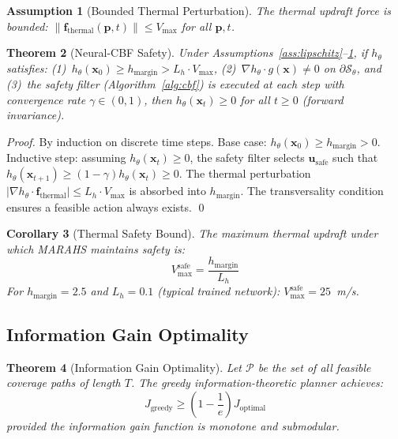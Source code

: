 \documentclass[12pt,a4paper]{article}
\DeclareRobustCommand{\cP}{\mathcal{P}}
\DeclareRobustCommand{\cS}{\mathcal{S}}
\DeclareRobustCommand{\vect}[1]{\bm{#1}}
\newtheorem{theorem}{Theorem}[section]
\newtheorem{corollary}[theorem]{Corollary}
\newtheorem{assumption}[theorem]{Assumption}
\begin{document}
\begin{assumption}[Bounded Thermal Perturbation]
\label{ass:thermal}
The thermal updraft force is bounded: $\|\vect{f}_{\text{thermal}}(\vect{p}, t)\| \leq V_{\max}$ for all $\vect{p}, t$.
\end{assumption}

\begin{theorem}[Neural-CBF Safety]
\label{thm:ncbf_safety}
Under Assumptions~\ref{ass:lipschitz}--\ref{ass:thermal}, if $h_\theta$ satisfies: (1)~$h_\theta(\vect{x}_0) \geq h_{\text{margin}} > L_h \cdot V_{\max}$, (2)~$\nabla h_\theta \cdot g(\vect{x}) \neq 0$ on $\partial \cS_\theta$, and (3)~the safety filter (Algorithm~\ref{alg:cbf}) is executed at each step with convergence rate $\gamma \in (0,1)$, then $h_\theta(\vect{x}_t) \geq 0$ for all $t \geq 0$ (forward invariance).
\end{theorem}

\begin{proof}
By induction on discrete time steps. Base case: $h_\theta(\vect{x}_0) \geq h_{\text{margin}} > 0$. Inductive step: assuming $h_\theta(\vect{x}_t) \geq 0$, the safety filter selects $\vect{u}_{\text{safe}}$ such that $h_\theta(\vect{x}_{t+1}) \geq (1-\gamma)h_\theta(\vect{x}_t) \geq 0$. The thermal perturbation $|\nabla h_\theta \cdot \vect{f}_{\text{thermal}}| \leq L_h \cdot V_{\max}$ is absorbed into $h_{\text{margin}}$. The transversality condition ensures a feasible action always exists. \qed
\end{proof}

\begin{corollary}[Thermal Safety Bound]
\label{cor:thermal}
The maximum thermal updraft under which MARAHS maintains safety is:
\begin{equation}
    V_{\max}^{\text{safe}} = \frac{h_{\text{margin}}}{L_h}
\end{equation}
For $h_{\text{margin}} = 2.5$ and $L_h = 0.1$ (typical trained network): $V_{\max}^{\text{safe}} = 25$~m/s.
\end{corollary}

\subsection{Information Gain Optimality}

\begin{theorem}[Information Gain Optimality]
\label{thm:info_opt}
Let $\cP$ be the set of all feasible coverage paths of length $T$. The greedy information-theoretic planner achieves:
\begin{equation}
    J_{\text{greedy}} \geq \left(1 - \frac{1}{e}\right) J_{\text{optimal}}
\end{equation}
provided the information gain function is monotone and submodular.
\end{theorem}
\end{document}
